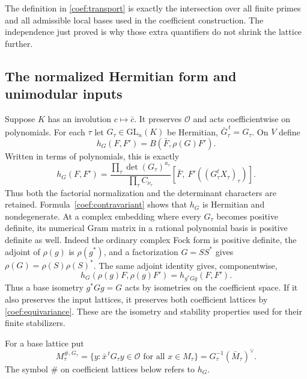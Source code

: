 The definition in \eqref{coef:transport} is exactly the intersection
over all finite primes and all admissible local bases used in the
coefficient construction. The independence just proved is why those
extra quantifiers do not shrink the lattice further.

\subsection{The normalized Hermitian form and unimodular inputs}

Suppose $K$ has an involution $c\mapsto\bar c$.
It preserves $\mathcal O$ and acts coefficientwise on polynomials.
For each $\tau$ let $G_\tau\in\mathrm{GL}_n(K)$ be Hermitian,
$\bar G_\tau^{\,t}=G_\tau$. On $V$ define
\begin{equation}\label{coef:hermitian}
 h_G(F,F')=B(\bar F,\rho(G)F').
\end{equation}
Written in terms of polynomials, this is exactly
\[
 h_G(F,F')=
 \frac{\prod_\tau\det(G_\tau)^{a_\tau}}
      {\prod_\tau C_{\nu_\tau}}
 [\bar F,\ F'((G_\tau^tX_\tau)_\tau)].
\]
Thus both the factorial normalization and the determinant characters
are retained. Formula~\eqref{coef:contravariant} shows that $h_G$ is
Hermitian and nondegenerate. At a complex embedding where every
$G_\tau$ becomes positive definite, its numerical Gram matrix in a
rational polynomial basis is positive definite as well. Indeed the
ordinary complex Fock form is positive definite, the adjoint of
$\rho(g)$ is $\rho(g^*)$, and a factorization $G=SS^*$ gives
$\rho(G)=\rho(S)\rho(S)^*$.
The same adjoint identity gives, componentwise,
\[
 h_G(\rho(g)F,\rho(g)F')=h_{g^*Gg}(F,F').
\]
Thus a base isometry $g^*Gg=G$ acts by isometries on the coefficient
space. If it also preserves the input lattices, it preserves both
coefficient lattices by \eqref{coef:equivariance}. These are the
isometry and stability properties used for their finite stabilizers.

For a base lattice put
\[
 M_\tau^{\#,G_\tau}
   =\{y:\bar x^{\,t}G_\tau y\in\mathcal O\text{ for all }x\in M_\tau\}
   =G_\tau^{-1}(\bar M_\tau)^\vee.
\]
The symbol $\#$ on coefficient lattices below refers to $h_G$.


